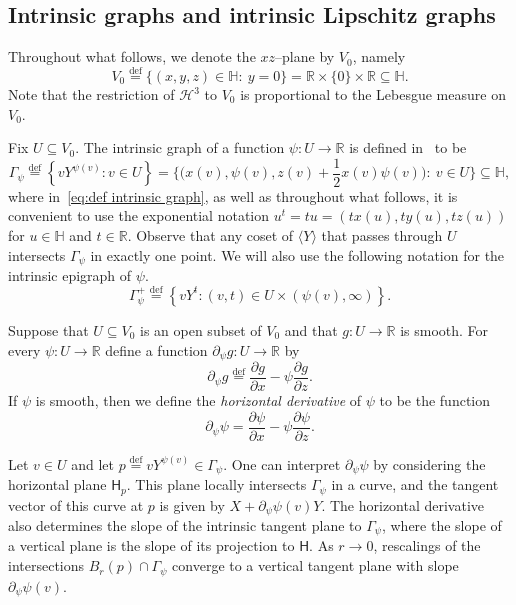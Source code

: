 \documentclass[11pt,reqno]{amsart}
\renewcommand{\H}{\mathbb{H}}
\newcommand{\R}{\mathbb{R}}
\newcommand{\cH}{\mathcal{H}}
\newcommand{\0}{\mathbf{0}}
\renewcommand{\1}{\mathbf 1}
\newcommand{\from}{\colon}
\renewcommand{\mid}{:}
\renewcommand{\subset}{\subseteq}
\newcommand{\eqdef}{\stackrel{\mathrm{def}}{=}}
\theoremstyle{remark}
\begin{document}
\subsection{Intrinsic graphs and intrinsic Lipschitz graphs}\label{sec:intrinsic graphs} Throughout what follows, we denote the $xz$--plane by $V_0$, namely
$$
V_0\eqdef \{(x,y,z)\in \H:\ y=0\}=\R\times \{0\}\times \R\subset \H.
$$
Note that the restriction of $\cH^3$ to $V_0$ is proportional to the Lebesgue measure on $V_0$.

Fix $U\subset V_0$.  The intrinsic graph of a function $\psi\from U\to \R$ is defined in~\cite{FSSC06} to be
\begin{equation}\label{eq:def intrinsic graph}
\Gamma_\psi\eqdef \left\{v Y^{\psi(v)} \mid v\in U\right\}=\Big\{\big(x(v),\psi(v),z(v)+\frac12x(v)\psi(v)\big):\ v\in U\Big\}\subset \H,
\end{equation}
where in~\eqref{eq:def intrinsic graph}, as well as throughout  what follows, it is convenient to use the exponential notation  $u^t=tu=(tx(u),ty(u),tz(u))$ for $u\in \H$ and $t\in \R$.
Observe that any coset of $\langle Y\rangle$ that passes through $U$ intersects $\Gamma_\psi$ in exactly one point. We will also use the following notation for the intrinsic epigraph of $\psi$.
$$
\Gamma_\psi^+\eqdef  \left\{v Y^{t} \mid (v,t)\in U\times (\psi(v),\infty)\right\}.
$$

Suppose that $U\subset V_0$ is an open subset of $V_0$ and that $g\from U\to \R$ is smooth. For every $\psi \from U\to \R$ define a function $\partial_\psi g\from U\to \R$ by
\begin{equation}\label{eq: d psi}
\partial_\psi g\eqdef \frac{\partial g}{\partial x}- \psi\frac{\partial g}{\partial z}.
\end{equation}
If $\psi$ is smooth, then we define the \emph{horizontal derivative} of $\psi$ to be the function
\begin{equation}\label{eq:d psi psi}
  \partial_\psi \psi=\frac{\partial \psi}{\partial x}- \psi\frac{\partial \psi}{\partial z}.
\end{equation}

Let $v\in U$ and let $p\eqdef vY^{\psi(v)}\in \Gamma_\psi$.
One can interpret $\partial_\psi \psi$ by considering the horizontal plane $\mathsf{H}_p$. This plane locally intersects $\Gamma_\psi$ in a curve, and the tangent vector of this curve at $p$ is given by $X+\partial_\psi \psi(v)Y$. The horizontal derivative also determines the slope of the intrinsic tangent plane to $\Gamma_\psi$, where the slope of a vertical plane is the slope of its projection to $\mathsf{H}$.
As $r\to 0$, rescalings of the intersections $B_r(p)\cap \Gamma_\psi$ converge to a vertical tangent plane with slope $\partial_\psi\psi(v)$.
\end{document}
